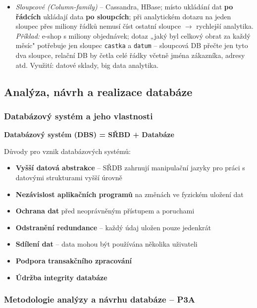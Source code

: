 \begin{enumerate}
\begin{itemize}
      \item \textit{Sloupcové (Column-family)} -- Cassandra, HBase; místo ukládání dat
        \textbf{po řádcích} ukládají data \textbf{po sloupcích}; při analytickém dotazu na jeden
        sloupec přes miliony řádků nemusí číst ostatní sloupce $\to$ rychlejší analytika. \\
        \textit{Příklad:} e-shop s miliony objednávek; dotaz „jaký byl celkový obrat za každý měsíc"
        potřebuje jen sloupec \texttt{castka} a \texttt{datum} -- sloupcová DB přečte jen tyto dva
        sloupce, relační DB by četla celé řádky včetně jména zákazníka, adresy atd.
        Využití: datové sklady, big data analytika.
    \end{itemize}
\end{enumerate}

\subsection{Analýza, návrh a realizace databáze}

\subsubsection{Databázový systém a jeho vlastnosti}

\textbf{Databázový systém (DBS) = SŘBD + Databáze}

Důvody pro vznik databázových systémů:
\begin{itemize}
  \item \textbf{Vyšší datová abstrakce} -- SŘDB zahrnují manipulační jazyky pro práci s datovými strukturami vyšší úrovně
  \item \textbf{Nezávislost aplikačních programů} na změnách ve fyzickém uložení dat
  \item \textbf{Ochrana dat} před neoprávněným přístupem a poruchami
  \item \textbf{Odstranění redundance} -- každý údaj uložen pouze jedenkrát
  \item \textbf{Sdílení dat} -- data mohou být používána několika uživateli
  \item \textbf{Podpora transakčního zpracování}
  \item \textbf{Údržba integrity databáze}
\end{itemize}

\subsubsection{Metodologie analýzy a návrhu databáze -- P3A}

